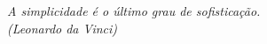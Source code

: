 \documentclass[
	12pt,				%
	openany,			%
	oneside,			%
	a4paper,			%
	english,			%
	french,				%
	spanish,			%
	brazil				%
	]{abntex2}
\begin{document}

%
%

\begin{epigrafe}
	\vspace*{\fill}
	\begin{flushright}
		\textit{A simplicidade é o último grau de sofisticação.\\
			(Leonardo da Vinci)}
	\end{flushright}
\end{epigrafe}

\end{document}
